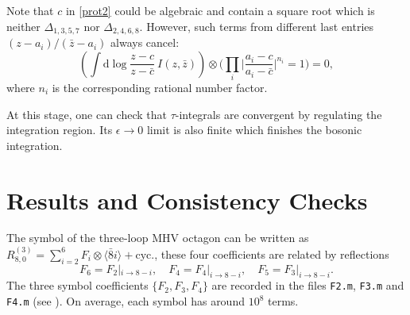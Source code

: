\documentclass[a4paper,12pt]{article}
\newcommand{\dif}{\mathrm{d}} %
\begin{document}

Note that $c$ in \eqref{prot2} could be algebraic and contain a square root which is neither $\Delta_{1,3,5,7}$ nor $\Delta_{2,4,6,8}$. However, such terms from different last entries $(z-a_i)/(\bar z-a_i)$ always cancel:
\[
\left(\int \dif\log\frac{z - c}{z - \bar c} \: I(z,\bar{z})\right)\otimes \biggl(\prod_i\biggl|\frac{a_i - c}{a_i - \bar c}\biggr|^{n_i}=1\biggr)=0,
\]
where $n_i$ is the corresponding rational number factor.

At this stage, one can check that $\tau$-integrals are convergent by regulating the integration region. 
Its $\epsilon\to 0$ limit is also finite which finishes the bosonic integration.


\section{Results and Consistency Checks} \label{sec:4} 

The symbol of the three-loop MHV octagon can be written as $R_{8,0}^{(3)}=\sum_{i=2}^6  F_{i}\otimes \langle \bar 8i\rangle+\text{cyc.}$, these four coefficients are related by reflections
\[
    F_6=F_2|_{i\to 8-i},\quad F_4=F_4|_{i\to 8-i} ,\quad F_5=F_3|_{i\to 8-i}.
\]
The three symbol coefficients $\{F_2,F_3,F_4\}$ are recorded in the files {\tt F2.m}, {\tt F3.m} and {\tt F4.m} (see \cite{3loopmhvoctagondata}). On average, each symbol has around $10^8$ terms.
\end{document}
